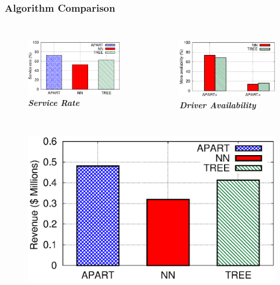 \documentclass[t]{beamer}
\begin{document}
\begin{frame}\frametitle{Algorithm Comparison}
\begin{columns}
\vspace{-0.4in}
\begin{figure}
	\centering
    \includegraphics[width = 0.95\columnwidth]{default_sr.eps}
    \vspace{-0.08in}
    \small{\textit{\textbf{Service Rate}}}
\end{figure}
\vspace{-0.4in}
\begin{figure}
	\centering
    \includegraphics[width = 0.95\columnwidth]{availability.eps}
    \vspace{-0.08in}
    \small{\textit{\textbf{Driver Availability}}}
\end{figure}
\end{columns}
\begin{columns}
\vspace{-0.1in}
\begin{figure}
	\centering
    \includegraphics[width = 0.95\columnwidth]{default_rev.eps}

\end{figure}
\end{columns}
\end{frame}
\end{document}
